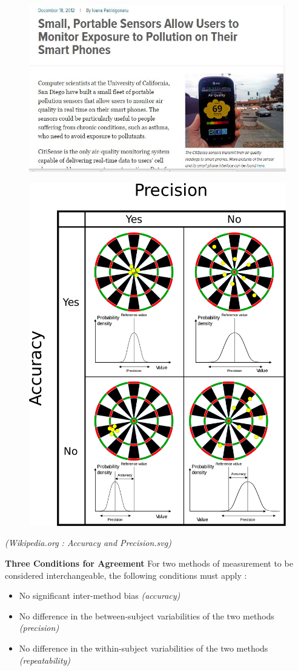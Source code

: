 \documentclass[compress]{beamer}        %
\makeatletter
\newcommand{\tcb}{\textcolor{beamer@blendedblue}}
\makeatother
\begin{document}
		\begin{frame}
			\begin{figure}
				\centering
				\includegraphics[width=1.05\linewidth]{images/airqualitysensornewsarticle}
				
			\end{figure}
			
		\end{frame}
		\begin{frame}
			\begin{figure}
\centering
\includegraphics[width=0.45\linewidth]{images/AccuracyPrecision}
\end{figure}
\textit{(Wikipedia.org : Accuracy and Precision.svg)}
		\end{frame}
		\begin{frame}{\bf \tcb{Three Conditions for Agreement}}
			\Large
			For two methods of measurement to be considered interchangeable, the following conditions must apply \cite{Roy2009}:
			\\
			\begin{itemize}\itemsep0.5cm
				\item No significant inter-method bias \textit{(accuracy)}
				\item No difference in the between-subject variabilities of the two methods \textit{(precision)}
				\item No difference in the within-subject variabilities of the two methods \textit{(repeatability)}
			\end{itemize}
		\end{frame}
		
\end{document}
